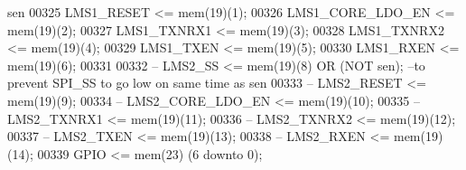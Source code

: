 \begin{DoxyCode}
{       sen}
00325         \textcolor{vhdlchar}{LMS1_RESET}          \textcolor{vhdlchar}{<=} \textcolor{vhdlchar}{mem}\textcolor{vhdlchar}{(}\textcolor{vhdllogic}{}\textcolor{vhdllogic}{19}\textcolor{vhdlchar}{)}\textcolor{vhdlchar}{(}\textcolor{vhdllogic}{}\textcolor{vhdllogic}{1}\textcolor{vhdlchar}{)};
00326         \textcolor{vhdlchar}{LMS1_CORE_LDO_EN}    \textcolor{vhdlchar}{<=} \textcolor{vhdlchar}{mem}\textcolor{vhdlchar}{(}\textcolor{vhdllogic}{}\textcolor{vhdllogic}{19}\textcolor{vhdlchar}{)}\textcolor{vhdlchar}{(}\textcolor{vhdllogic}{}\textcolor{vhdllogic}{2}\textcolor{vhdlchar}{)};
00327         \textcolor{vhdlchar}{LMS1_TXNRX1}         \textcolor{vhdlchar}{<=} \textcolor{vhdlchar}{mem}\textcolor{vhdlchar}{(}\textcolor{vhdllogic}{}\textcolor{vhdllogic}{19}\textcolor{vhdlchar}{)}\textcolor{vhdlchar}{(}\textcolor{vhdllogic}{}\textcolor{vhdllogic}{3}\textcolor{vhdlchar}{)}; 
00328         \textcolor{vhdlchar}{LMS1_TXNRX2}         \textcolor{vhdlchar}{<=} \textcolor{vhdlchar}{mem}\textcolor{vhdlchar}{(}\textcolor{vhdllogic}{}\textcolor{vhdllogic}{19}\textcolor{vhdlchar}{)}\textcolor{vhdlchar}{(}\textcolor{vhdllogic}{}\textcolor{vhdllogic}{4}\textcolor{vhdlchar}{)};
00329         \textcolor{vhdlchar}{LMS1_TXEN}           \textcolor{vhdlchar}{<=} \textcolor{vhdlchar}{mem}\textcolor{vhdlchar}{(}\textcolor{vhdllogic}{}\textcolor{vhdllogic}{19}\textcolor{vhdlchar}{)}\textcolor{vhdlchar}{(}\textcolor{vhdllogic}{}\textcolor{vhdllogic}{5}\textcolor{vhdlchar}{)}; 
00330         \textcolor{vhdlchar}{LMS1_RXEN}           \textcolor{vhdlchar}{<=} \textcolor{vhdlchar}{mem}\textcolor{vhdlchar}{(}\textcolor{vhdllogic}{}\textcolor{vhdllogic}{19}\textcolor{vhdlchar}{)}\textcolor{vhdlchar}{(}\textcolor{vhdllogic}{}\textcolor{vhdllogic}{6}\textcolor{vhdlchar}{)};
00331     
00332 \textcolor{keyword}{--      LMS2\_SS                 <= mem(19)(8) OR (NOT sen); --to prevent SPI\_SS to go low on same time as
       sen}
00333 \textcolor{keyword}{--      LMS2\_RESET          <= mem(19)(9);}
00334 \textcolor{keyword}{--      LMS2\_CORE\_LDO\_EN    <= mem(19)(10); }
00335 \textcolor{keyword}{--      LMS2\_TXNRX1         <= mem(19)(11);}
00336 \textcolor{keyword}{--      LMS2\_TXNRX2         <= mem(19)(12);}
00337 \textcolor{keyword}{--      LMS2\_TXEN           <= mem(19)(13);}
00338 \textcolor{keyword}{--      LMS2\_RXEN           <= mem(19)(14);}
00339         \textcolor{vhdlchar}{GPIO}                    \textcolor{vhdlchar}{<=} \textcolor{vhdlchar}{mem}\textcolor{vhdlchar}{(}\textcolor{vhdllogic}{}\textcolor{vhdllogic}{23}\textcolor{vhdlchar}{)} \textcolor{vhdlchar}{(}\textcolor{vhdllogic}{}\textcolor{vhdllogic}{6} \textcolor{keywordflow}{downto} \textcolor{vhdllogic}{}\textcolor{vhdllogic}{0}\textcolor{vhdlchar}{)};

\end{DoxyCode}

